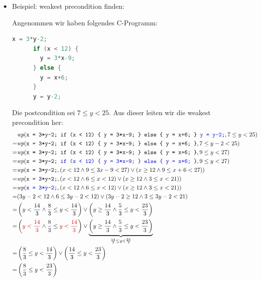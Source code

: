 \documentclass[
  a4paper,
  11pt,
]{scrartcl}
\newcommand{\wpc}{\textit{wp}}
\begin{document}
\begin{itemize}
  \item Beispiel: weakest precondition finden:

    Angenommen wir haben folgendes C-Programm:
    \begin{lstlisting}[language=C]
      x = 3*y-2;
      if (x < 12) {
        y = 3*x-9;
      } else {
        y = x+6;
      }
      y = y-2;
    \end{lstlisting}
    Die postcondition sei $7 \leq y < 25$. Aus dieser leiten wir die weakest
    precondition her:
    \begin{align*}
      & \wpc(\texttt{x = 3*y-2;
          if (x < 12) \{
            y = 3*x-9;
          \} else \{
            y = x+6;
          \}
          \textcolor{myblue}{y = y-2;}},
        7 \leq y < 25
      )\\
      =
      & \wpc(\texttt{x = 3*y-2;
          if (x < 12) \{
            y = 3*x-9;
          \} else \{
            y = x+6;
          \}},
        7 \leq y-2 < 25
      )\\
      =
      & \wpc(\texttt{x = 3*y-2;
          if (x < 12) \{
            y = 3*x-9;
          \} else \{
            y = x+6;
          \}},
        9 \leq y < 27
      )\\
      =
      & \wpc(\texttt{x = 3*y-2;
          \textcolor{myblue}{if (x < 12) \{
            y = 3*x-9;
          \} else \{
            y = x+6;
          \}}},
        9 \leq y < 27
      )\\
      =
      & \wpc(\texttt{x = 3*y-2;},
        (x < 12 \land 9 \leq 3x-9 < 27)
        \lor
        (x \geq 12 \land 9 \leq x+6 < 27)
      )\\
      =
      & \wpc(\texttt{x = 3*y-2;},
        (x < 12 \land 6 \leq x < 12)
        \lor
        (x \geq 12 \land 3 \leq x < 21)
      )\\
      =
      & \wpc(\texttt{\textcolor{myblue}{x = 3*y-2;}},
        (x < 12 \land 6 \leq x < 12)
        \lor
        (x \geq 12 \land 3 \leq x < 21)
      )\\
      =
      & (3y-2 < 12 \land 6 \leq 3y-2 < 12)
        \lor
        (3y-2 \geq 12 \land 3 \leq 3y-2 < 21)
      \\
      =
      & \left(y < \frac{14}{3} \land \frac{8}{3} \leq y < \frac{14}{3}\right)
        \lor
        \left(y \geq \frac{14}{3} \land \frac{5}{3} \leq y < \frac{23}{3}\right)
      \\
      =
      & \left(
          \textcolor{myred}{y < \frac{14}{3}}
            \land
          \frac{8}{3} \leq \textcolor{myred}{y < \frac{14}{3}}
        \right)
        \lor
        \underbrace{%
          \left(
            y \geq \frac{14}{3}
            \land
            \frac{5}{3} \leq y < \frac{23}{3}
          \right)
        }_{%
          \frac{14}{3} \leq y < \frac{23}{3}
        }
      \\
      =
      & \left(
          \frac{8}{3} \leq y < \frac{14}{3}
        \right)
        \lor
        \left(
          \frac{14}{3} \leq y < \frac{23}{3}
        \right)
      \\
      = & \left( \frac{8}{3} \leq y < \frac{23}{3} \right)
    \end{align*}
\end{itemize}
\end{document}

